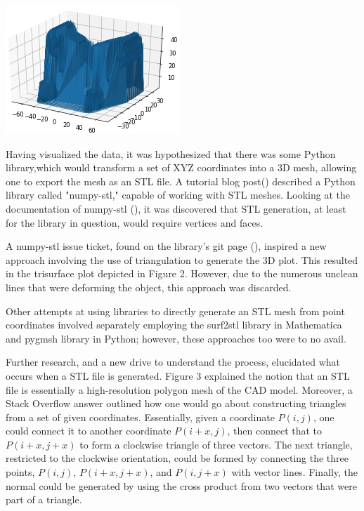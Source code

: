 \documentclass[11pt, A4paper]{article}
\begin{document}
\begin{multicols}{2}
\begingroup
    \bigskip
    \centering
    \includegraphics[width=\columnwidth]{trisurface}
    \small{}
    \label{fig:trisurf_vis}
        \bigskip
\endgroup

Having visualized the data, it was hypothesized that there was some Python library,which would transform a set of XYZ coordinates into a 3D mesh, allowing one to export the mesh as an STL file. A tutorial blog post(\cite[]{stlblog}) described a Python library called "numpy-stl," capable of working with STL meshes. Looking at the documentation of numpy-stl (\cite[]{numpy-stl}), it was discovered that STL generation, at least for the library in question, would require vertices and faces. 

A numpy-stl issue ticket, found on the library's git page (\cite[]{stl-ticket}), inspired a new approach involving the use of triangulation to generate the 3D plot. This resulted in the trisurface plot depicted in Figure 2. However, due to the numerous unclean lines that were deforming the object, this approach was discarded. 

Other attempts at using libraries to directly generate an STL mesh from point coordinates involved separately employing the surf2stl library in Mathematica and pygmsh library in Python; however, these approaches too were to no avail.

Further research, and a new drive to understand the process, elucidated what occurs when a STL file is generated. Figure 3 explained the notion that an STL file is essentially a high-resolution polygon mesh of the CAD model. Moreover, a Stack Overflow answer outlined how one would go about constructing triangles from a set of given coordinates. Essentially, given a coordinate \ensuremath{P(i,j)}, one could connect it to another coordinate \ensuremath{P(i+x,j)}, then connect that to \ensuremath{P(i+x, j+x)} to form a clockwise triangle of three vectors. The next triangle, restricted to the clockwise orientation, could be formed by connecting the three points, \ensuremath{P(i,j)}, \ensuremath{P(i+x, j+x)}, and \ensuremath{P(i, j+x)} with vector lines. Finally, the normal could be generated by using the cross product from two vectors that were part of a triangle.


\end{multicols}
\end{document}

